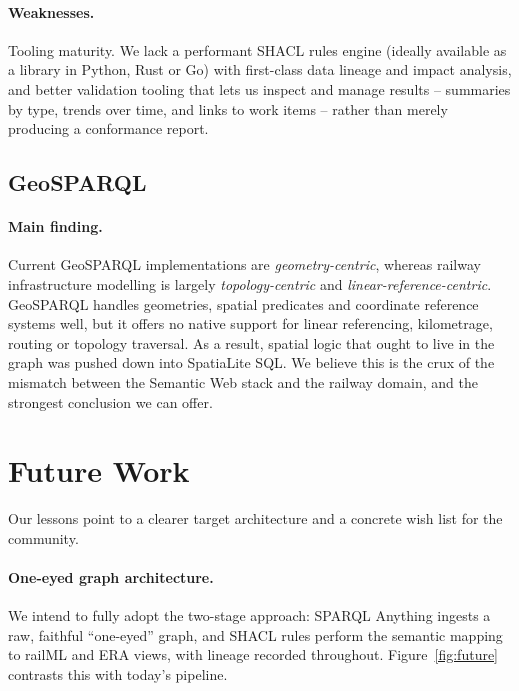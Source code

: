 \documentclass[twocolumn]{ceurart}
\begin{document}
\paragraph{Weaknesses.} Tooling maturity. We lack a performant SHACL rules engine
(ideally available as a library in Python, Rust or Go) with first-class data
lineage and impact analysis, and better validation tooling that lets us inspect
and manage results -- summaries by type, trends over time, and links to work
items -- rather than merely producing a conformance report.

\subsection{GeoSPARQL}

\paragraph{Main finding.} Current GeoSPARQL implementations are
\emph{geometry-centric}, whereas railway infrastructure modelling is largely
\emph{topology-centric} and \emph{linear-reference-centric}. GeoSPARQL handles
geometries, spatial predicates and coordinate reference systems well, but it
offers no native support for linear referencing, kilometrage, routing or
topology traversal. As a result, spatial logic that ought to live in the graph
was pushed down into SpatiaLite SQL. We believe this is the crux of the mismatch
between the Semantic Web stack and the railway domain, and the strongest
conclusion we can offer.

\section{Future Work}
\label{sec:future}

Our lessons point to a clearer target architecture and a concrete wish list for
the community.

\paragraph{One-eyed graph architecture.} We intend to fully adopt the two-stage
approach: SPARQL Anything ingests a raw, faithful ``one-eyed'' graph, and SHACL
rules perform the semantic mapping to railML and ERA views, with lineage
recorded throughout. Figure~\ref{fig:future} contrasts this with today's
pipeline.
\end{document}
